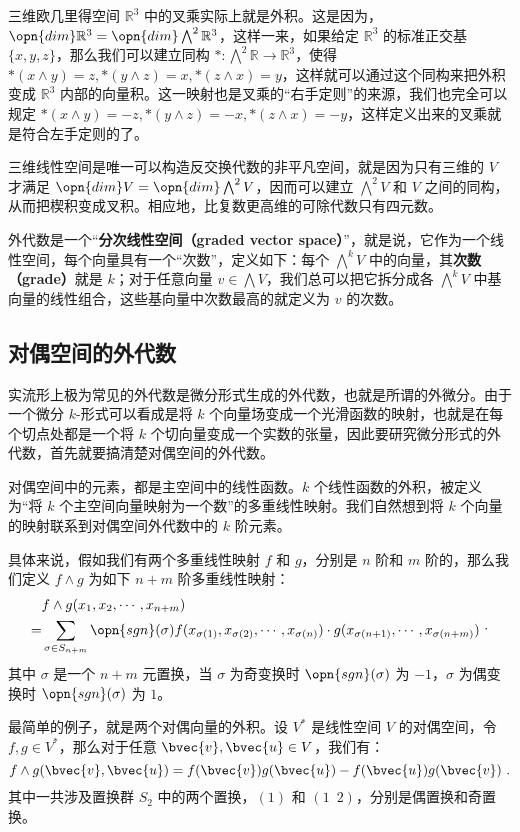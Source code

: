 三维欧几里得空间 $\mathbb{R}^3$ 中的叉乘实际上就是外积。这是因为，$\opn{dim}\mathbb{R}^3=\opn{dim}\bigwedge^2\mathbb{R}^3$，这样一来，如果给定 $\mathbb{R}^3$ 的标准正交基 $\{x, y, z\}$，那么我们可以建立同构 $*: \bigwedge^2\mathbb{R}\rightarrow\mathbb{R}^3$，使得 $*(x\wedge y)=z, *(y\wedge z)=x, *(z\wedge x)=y$，这样就可以通过这个同构来把外积变成 $\mathbb{R}^3$ 内部的向量积。这一映射也是叉乘的“右手定则”的来源，我们也完全可以规定 $*(x\wedge y)=-z, *(y\wedge z)=-x, *(z\wedge x)=-y$，这样定义出来的叉乘就是符合左手定则的了。

三维线性空间是唯一可以构造反交换代数的非平凡空间，就是因为只有三维的 $V$ 才满足 $\opn{dim}V=\opn{dim}\bigwedge^2V$，因而可以建立 $\bigwedge^2 V$ 和 $V$ 之间的同构，从而把楔积变成叉积。相应地，比复数更高维的可除代数只有四元数。

外代数是一个“\textbf{分次线性空间（graded vector space）}”，就是说，它作为一个线性空间，每个向量具有一个“次数”，定义如下：每个 $\bigwedge^kV$ 中的向量，其\textbf{次数（grade）}就是 $k$；对于任意向量 $v\in \bigwedge V$，我们总可以把它拆分成各 $\bigwedge^kV$ 中基向量的线性组合，这些基向量中次数最高的就定义为 $v$ 的次数。


\subsection{对偶空间的外代数}\label{sub_ExtAlg_1}

实流形上极为常见的外代数是微分形式生成的外代数，也就是所谓的外微分。由于一个微分 $k$-形式可以看成是将 $k$ 个向量场变成一个光滑函数的映射，也就是在每个切点处都是一个将 $k$ 个切向量变成一个实数的张量，因此要研究微分形式的外代数，首先就要搞清楚对偶空间的外代数。

对偶空间中的元素，都是主空间中的线性函数。$k$ 个线性函数的外积，被定义为“将 $k$ 个主空间向量映射为一个数”的多重线性映射。我们自然想到将 $k$ 个向量的映射联系到对偶空间外代数中的 $k$ 阶元素。

具体来说，假如我们有两个多重线性映射 $f$ 和 $g$，分别是 $n$ 阶和 $m$ 阶的，那么我们定义 $f\wedge g$ 为如下 $n+m$ 阶多重线性映射：
\begin{equation}
\begin{aligned}
&f\wedge g(x_1, x_2, \cdots, x_{n+m})\\=
&\sum\limits_{\sigma\in S_{n+m}}\opn{sgn}(\sigma) f(x_{\sigma(1)}, x_{\sigma(2)}, \cdots, x_{\sigma(n)})\cdot g(x_{\sigma(n+1)}, \cdots, x_{\sigma(n+m)})
\end{aligned}~.
\end{equation}
其中 $\sigma$ 是一个 $n+m$ 元置换，当 $\sigma$ 为奇变换时 $\opn{sgn}(\sigma)$ 为 $-1$，$\sigma$ 为偶变换时 $\opn{sgn}(\sigma)$ 为 $1$。

最简单的例子，就是两个对偶向量的外积。设 $V^*$ 是线性空间 $V$ 的对偶空间，令 $f, g\in V^*$，那么对于任意 $\bvec{v}, \bvec{u}\in V$，我们有：
\begin{equation}
f\wedge g(\bvec{v}, \bvec{u})=f(\bvec{v})g(\bvec{u})-f(\bvec{u})g(\bvec{v})~.
\end{equation}
其中一共涉及置换群 $S_2$ 中的两个置换，$(1)$ 和 $(1\phantom{2}2)$，分别是偶置换和奇置换。
